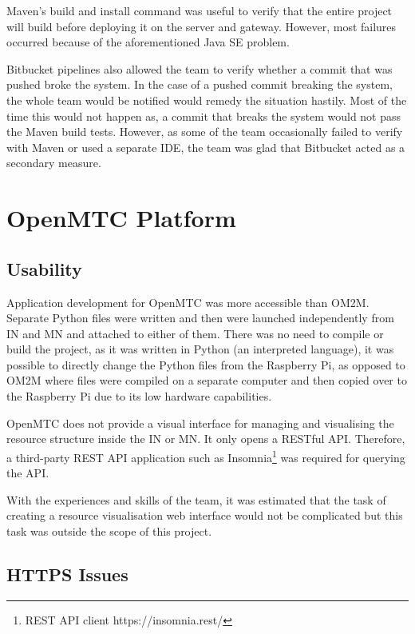 Maven's build and install command was useful to verify that the entire project will build before deploying it on the server and gateway. However, most failures occurred because of the aforementioned Java SE problem.

Bitbucket pipelines also allowed the team to verify whether a commit that was pushed broke the system. In the case of a pushed commit breaking the system, the whole team would be notified would remedy the situation hastily. Most of the time this would not happen as, a commit that breaks the system would not pass the Maven build tests. However, as some of the team occasionally failed to verify with Maven or used a separate IDE, the team was glad that Bitbucket acted as a secondary measure.

\section{OpenMTC Platform}

\subsection{Usability}

Application development for OpenMTC was more accessible than OM2M. Separate Python files were written and then were launched independently from IN and MN and attached to either of them. There was no need to compile or build the project, as it was written in Python (an interpreted language), it was possible to directly change the Python files from the Raspberry Pi, as opposed to OM2M where files were compiled on a separate computer and then copied over to the Raspberry Pi due to its low hardware capabilities.

OpenMTC does not provide a visual interface for managing and visualising the resource structure inside the IN or MN. It only opens a RESTful API. Therefore, a third-party REST API application such as Insomnia\footnote{REST API client https://insomnia.rest/} was required for querying the API.

With the experiences and skills of the team, it was estimated that the task of creating a resource visualisation web interface would not be complicated but this task was outside the scope of this project.

\subsection{HTTPS Issues}

